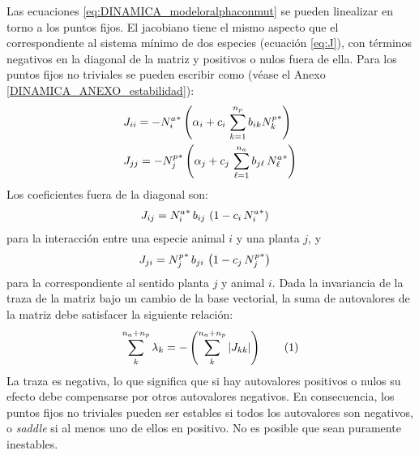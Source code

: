 Las ecuaciones  \ref{eq:DINAMICA_modeloralphaconmut} se pueden linealizar en torno a los puntos fijos. El jacobiano tiene el mismo aspecto que el correspondiente al sistema mínimo de dos especies (ecuación \eqref{eq:J}), con términos negativos en la diagonal de la matriz y positivos o nulos fuera de ella. Para los puntos fijos no triviales se pueden escribir como (véase el Anexo \ref{DINAMICA_ANEXO_estabilidad}):
\begin{align}
\displaystyle & J_{ii}= - {N^{a}_{i}}^* \left(\alpha_{i} + c_{i} \,  \sum_{k=1}^{n_{p}} b_{ik} {N^{p}_{k}}^* \right) \nonumber\\
\displaystyle & J_{jj}= - {N^{p}_{j}}^* \left(\alpha_{j} + c_{j} \, \sum_{\ell=1}^{n_{a}} b_{j\ell}\, {N^{a}_{\ell}}^*\right)
\label{eq:Jii}
\end{align}
Los coeficientes fuera de la diagonal son:
\begin{align}
\displaystyle & J_{ij}={N^{a}_{i}}^* \, b_{ij}\, \left( 1-c_{i}\, {N^{a}_{i}}^*\right) 
\label{eq:Jij1}
\end{align}
para la interacción entre una especie animal $i$ y una planta $j$, y 
\begin{align}
\displaystyle & J_{ji}={N^{p}_{j}}^* \, b_{ji}\, \left( 1-c_{j}\, {N^{p}_{j}}^*\right)
\label{eq:Jij2}
\end{align}
para la correspondiente al sentido planta $j$ y animal $i$. Dada la invariancia de la traza de la matriz bajo un cambio de la base vectorial, la suma de autovalores de la matriz debe satisfacer la siguiente relación:
\begin{equation}
  \sum_{k}^{n_{a}+n_{p}} \lambda_{k}= - \left(\sum_{k}^{n_{a}+n_{p}} |J_{kk}| \right)
  \stepcounter{equation}\tag{\theequation}\label{eq:sum_lambdas2}
\end{equation}
La traza es negativa, lo que significa que si hay autovalores positivos o nulos su efecto debe compensarse por otros autovalores negativos. En consecuencia, los puntos fijos no triviales pueden ser estables si todos los autovalores son negativos, o \textit{saddle} si al menos uno de ellos en positivo. No es posible que sean puramente inestables.

